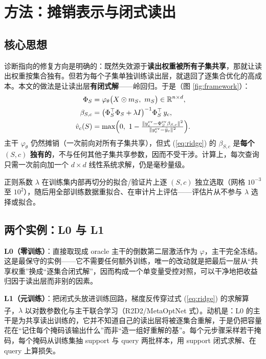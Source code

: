 \documentclass[10.5pt,compsoc,UTF8]{CjC}
\theoremstyle{mystyle}
\newcommand{\upcite}[1]{\textsuperscript{\cite{#1}}}
\begin{document}
\section{\heiti 方法：摊销表示与闭式读出}

\subsection{核心思想}

诊断指向的修复方向是明确的：既然失效源于\textbf{读出权重被所有子集共享}，那就让读出权重按集合独有。但若为每个子集单独训练读出层，就退回了逐集合优化的高成本。本文的做法是让读出层\textbf{有闭式解}——岭回归。于是（图 \ref{fig:framework}）：
\begin{align}
\Phi_S &= \varphi_\theta\bigl(X\odot m_S,\ m_S\bigr) \in\mathbb{R}^{n\times d}, \label{eq:phi}\\
\beta_{S,c} &= \bigl(\Phi_S^{\top}\Phi_S+\lambda I\bigr)^{-1}\Phi_S^{\top}\,y_c, \label{eq:ridge}\\
\hat{v}_c(S) &= \max\Bigl(0,\ 1-\tfrac{\|y_c^{\mathrm{ev}}-\Phi_S^{\mathrm{ev}}\beta_{S,c}\|^2}{\|y_c^{\mathrm{ev}}-\bar{y}_c\|^2}\Bigr). \label{eq:r2}
\end{align}
主干 $\varphi_\theta$ 仍然摊销（一次前向对所有子集共享），但式 (\ref{eq:ridge}) 的 $\beta_{S,c}$ 是\textbf{每个 $(S,c)$ 独有的}，不与任何其他子集共享参数，因而不受干涉。计算上，每次查询只需一次前向加一个 $d\times d$ 线性系统求解，仍是毫秒量级。

正则系数 $\lambda$ 在训练集内部再切分的拟合/验证片上逐 $(S,c)$ 独立选取（网格 $10^{-3}$ 至 $10^{2}$），随后用全部训练数据重拟合、在审计片上评估——评估片从不参与 $\lambda$ 选择或拟合。

\subsection{两个实例：L0 与 L1}

\textbf{L0（零训练）}：直接取现成 oracle 主干的倒数第二层激活作为 $\varphi$，主干完全冻结。这是最保守的实例——它不需要任何额外训练，唯一的改动就是把最后一层从“共享权重”换成“逐集合闭式解”，因而构成一个单变量受控对照，可以干净地把收益归因于读出层而非别的因素。

\textbf{L1（元训练）}：把闭式头放进训练回路，梯度反传穿过式 (\ref{eq:ridge}) 的求解算子，$\lambda$ 以对数参数化与主干联合学习（R2D2/MetaOptNet 式\upcite{bertinetto2019r2d2,lee2019metaoptnet}）。动机是：L0 的主干是为共享读出训练的，它并不知道自己的读出层将被逐集合重解，于是仍把容量花在“记住每个掩码该输出什么”而非“造一组好重解的基”。每个元步骤采样若干掩码，每个掩码从训练集抽 support 与 query 两批样本，用 support 闭式求解、在 query 上算损失。
\end{document}
